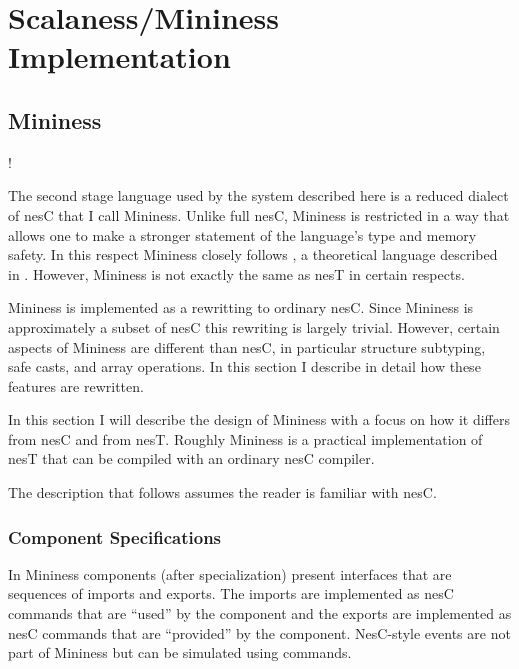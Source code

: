 \chapter{Scalaness/Mininess Implementation}
\label{chapter-scalaness-mininess-implementation}


\section{Mininess}
\label{section-mininess-implementation}

\lstset{language=nesC}
\lstMakeShortInline!

The second stage language used by the system described here is a reduced dialect of nesC that I
call Mininess. Unlike full nesC, Mininess is restricted in a way that allows one to make a
stronger statement of the language's type and memory safety.  In this respect
Mininess closely follows , a theoretical language described in \cite{XXX}.
However, Mininess is not exactly the same as nesT in certain respects. 

Mininess is implemented as a rewritting to ordinary nesC. Since Mininess is approximately a
subset of nesC this rewriting is largely trivial. However, certain aspects of Mininess are
different than nesC, in particular structure subtyping, safe casts, and array operations. In
this section I describe in detail how these features are rewritten.

In this section I will describe the design of Mininess with a focus on how it differs from nesC
and from nesT. Roughly Mininess is a practical implementation of nesT that can be compiled with
an ordinary nesC compiler.

The description that follows assumes the reader is familiar with nesC.

\subsection{Component Specifications}
\label{section-component-specifications-implementation}

In Mininess components (after specialization) present interfaces that are sequences of imports
and exports. The imports are implemented as nesC commands that are ``used'' by the component and
the exports are implemented as nesC commands that are ``provided'' by the component. NesC-style
events are not part of Mininess but can be simulated using commands.

